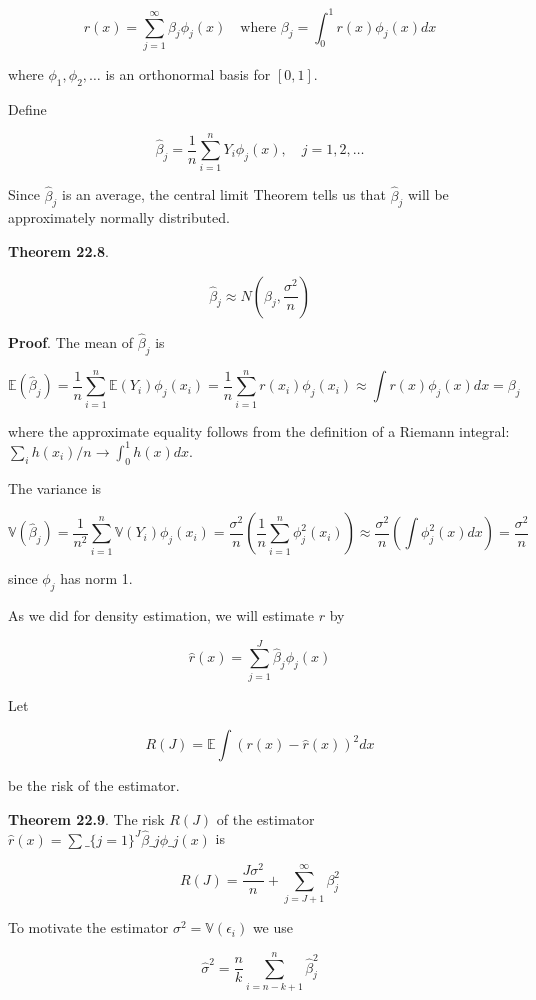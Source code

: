 \[
r(x) = \sum_{j=1}^{\infty} \beta_{j} \phi_{j}(x)
\quad \text{where } \beta_{j} = \int_{0}^{1} r(x) \phi_{j}(x) dx
\]

where \(\phi_{1}, \phi_{2}, \dots\) is an orthonormal basis for \([0, 1]\).

Define

\[ \hat{\beta}_{j} = \frac{1}{n} \sum_{i=1}^{n} Y_{i} \phi_{j}(x), 
\quad j = 1, 2, \dots\]

Since \(\hat{\beta}_{j}\) is an average, the central limit Theorem tells
us that \(\hat{\beta}_{j}\) will be approximately normally distributed.

\textbf{Theorem 22.8}.

\[ \hat{\beta}_{j} \approx N \left( \beta_{j}, \frac{\sigma^{2}}{n} \right) \]

\textbf{Proof}. The mean of \(\hat{\beta}_{j}\) is

\[ \mathbb{E}(\hat{\beta}_{j}) = \frac{1}{n} \sum_{i=1}^{n} \mathbb{E}(Y_{i}) \phi_{j}(x_{i}) = \frac{1}{n} \sum_{i=1}^{n} r(x_{i}) \phi_{j}(x_{i}) \approx \int r(x) \phi_{j}(x) dx = \beta_{j}\]

where the approximate equality follows from the definition of a Riemann
integral: \(\sum_{i} h(x_{i}) / n \rightarrow \int_{0}^{1} h(x) dx\).

The variance is

\[ \mathbb{V}(\hat{\beta}_{j}) = \frac{1}{n^{2}} \sum_{i=1}^{n} \mathbb{V}(Y_{i}) \phi_{j}(x_{i}) = \frac{\sigma^{2}}{n} \left( \frac{1}{n} \sum_{i=1}^{n} \phi_{j}^{2}(x_{i}) \right) \approx \frac{\sigma^{2}}{n} \left( \int \phi_{j}^{2}(x) dx \right) = \frac{\sigma^{2}}{n}\]

since \(\phi_{j}\) has norm 1.

As we did for density estimation, we will estimate \(r\) by

\[ \hat{r}(x) = \sum_{j=1}^J \hat{\beta}_{j} \phi_{j}(x) \]

Let

\[ R(J) = \mathbb{E} \int (r(x) - \hat{r}(x))^{2} dx \]

be the risk of the estimator.

\textbf{Theorem 22.9}. The risk \(R(J)\) of the estimator $ \hat{r}(x)
= \sum\_\{j=1\}^{J} \hat{\beta}\_{j} \phi\_{j}(x) $ is

\[ R(J) = \frac{J \sigma^{2}}{n} + \sum_{j=J+1}^{\infty} \beta_{j}^{2} \]

To motivate the estimator \(\sigma^{2} = \mathbb{V}(\epsilon_{i})\) we use

\[ \hat{\sigma}^{2} = \frac{n}{k} \sum_{i=n - k + 1}^{n} \hat{\beta}_{j}^{2} \]


